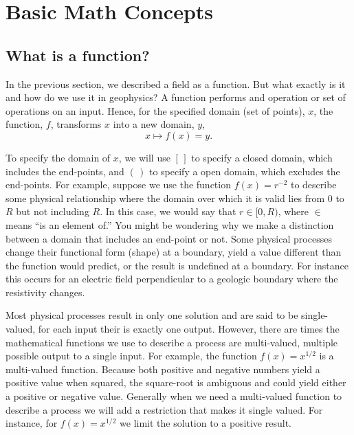 \section{Basic Math Concepts}

\subsection{What is a function?}

In the previous section, we described a field as a function.  But what exactly is it and how do we use it in geophysics?  A function performs and operation or set of operations on an input.  Hence, for the specified domain (set of points), $x$, the function, $f$, transforms $x$ into a new domain, $y$,
\[
    x \mapsto f(x) = y.
\]

To specify the domain of $x$, we will use $[\,]$ to specify a closed domain, which includes the end-points, and $(\,)$ to specify a open domain, which excludes the end-points.  For example, suppose we use the function $f(x) = r^{-2}$ to describe some physical relationship where the domain over which it is valid lies from $0$ to $R$ but not including $R$.  In this case, we would say that $r \in [0,R)$, where $\in$ means ``is an element of.''  You might be wondering why we make a distinction between a domain that includes an end-point or not.  Some physical processes change their functional form (shape) at a boundary, yield a value different than the function would predict, or the result is undefined at a boundary.  For instance this occurs for an electric field perpendicular to a geologic boundary where the resistivity changes.

Most physical processes result in only one solution and are said to be single-valued, for each input their is exactly one output.  However, there are times the mathematical functions we use to describe a process are multi-valued, multiple possible output to a single input.  For example, the function $f(x) = x^{1/2}$ is a multi-valued function.  Because both positive and negative numbers yield a positive value when squared, the square-root is ambiguous and could yield either a positive or negative value.  Generally when we need a multi-valued function to describe a process we will add a restriction that makes it single valued.  For instance, for $f(x) = x^{1/2}$ we limit the solution to a positive result.

